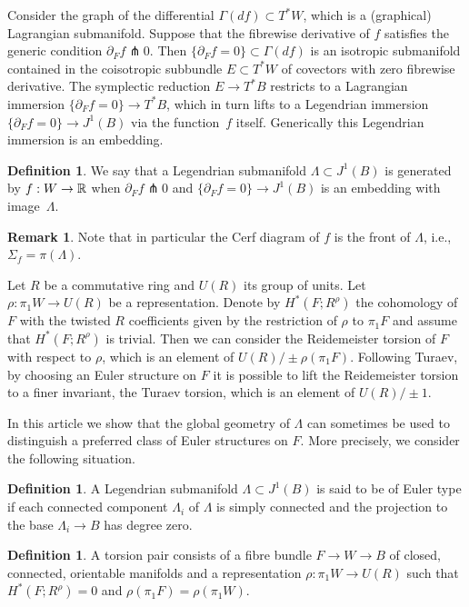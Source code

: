 \documentclass[11pt]{article}
\newcommand{\ie}{i.e.,\xspace}
\numberwithin{equation}{section}\providecommand{\dpl}{\displaystyle}
\theoremstyle{plain}
\theoremstyle{definition}
\newtheorem{definition}[theorem]{Definition}
\newtheorem{remark}[theorem]{Remark}
\begin{document}
Consider the graph of the differential $\Gamma(df) \subset T^*W$, which is a (graphical) Lagran\-gian submanifold. Suppose that the fibrewise derivative of $f$ satisfies the generic condition $\partial_F f \pitchfork 0 $. Then $ \{ \partial_F f = 0 \} \subset \Gamma(df)$ is an isotropic submanifold contained in the coisotropic subbundle $E \subset T^*W$ of covectors with zero fibrewise derivative. The symplectic reduction $E \to T^*B$ restricts to a Lagrangian immersion $\{ \partial_F f= 0 \} \to T^*B$, which in turn lifts to a Legendrian immersion $\{ \partial_Ff = 0 \} \to J^1(B)$ via the function~$f$ itself. Generically this Legendrian immersion is an embedding.

\begin{definition} We say that a Legendrian submanifold $\Lambda \subset J^1(B)$ is generated by $f:W \to \mathbb{R}$ when $\partial_F f \pitchfork 0 $ and $\{ \partial_F f = 0 \} \to J^1 (B)$ is an embedding with image~$\Lambda$.
\end{definition}

\begin{remark}
Note that in particular the Cerf diagram of $f$ is the front of $\Lambda$, \ie $\Sigma_f=\pi(\Lambda)$.
\end{remark}

Let $R$ be a commutative ring and $U(R)$ its group of units. Let $\rho: \pi_1W \to U(R)$ be a representation. Denote by $H^*(F;R^\rho)$ the cohomology of $F$ with the twisted $R$ coefficients given by the restriction of $\rho$ to $\pi_1F$ and assume that $H^*(F;R^\rho)$ is trivial. Then we can consider the Reidemeister torsion of $F$ with respect to $\rho$, which is an element of $U(R) / \pm \rho(\pi_1F)$. Following Turaev, by choosing an Euler structure on $F$ it is possible to lift the Reidemeister torsion to a finer invariant, the Turaev torsion, which is an element of $U(R) / \pm 1$.

In this article we show that the global geometry of
$\Lambda$ can sometimes be used to distinguish a preferred class of Euler structures on $F$. More precisely, we consider the following situation.

\begin{definition}
A Legendrian submanifold $\Lambda \subset J^1(B)$ is said to be of Euler type if each connected component $\Lambda_i$ of $\Lambda$ is simply connected and the projection to the base $\Lambda_i \to B$ has degree zero.
\end{definition}

\begin{definition}
A torsion pair consists of a fibre bundle $F \to W \to B$ of closed, connected, orientable manifolds and a representation $\rho:\pi_1W \to U(R)$ such that $H^*(F;R^\rho)=0$ and $\rho(\pi_1F)=\rho(\pi_1W)$.
\end{definition}
\end{document}
